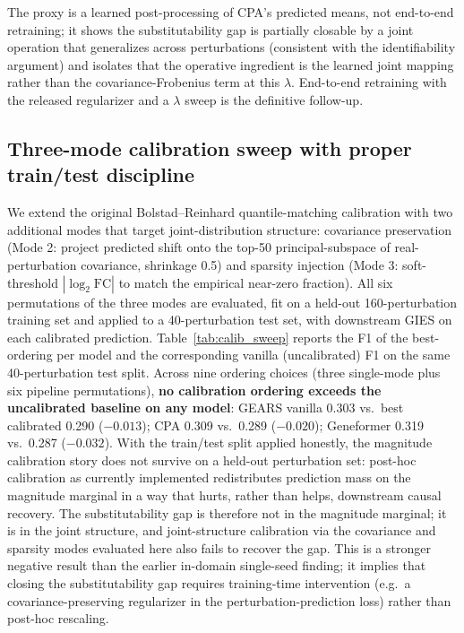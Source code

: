 \documentclass{article}
\theoremstyle{plain}
\theoremstyle{definition}
\theoremstyle{remark}
\begin{document}
The proxy is a learned post-processing of CPA's predicted means, not end-to-end retraining; it shows the substitutability gap is partially closable by a joint operation that generalizes across perturbations (consistent with the identifiability argument) and isolates that the operative ingredient is the learned joint mapping rather than the covariance-Frobenius term at this $\lambda$. End-to-end retraining with the released regularizer and a $\lambda$ sweep is the definitive follow-up.

\subsection{Three-mode calibration sweep with proper train/test discipline}
\label{app:calib-sweep}
We extend the original Bolstad--Reinhard quantile-matching calibration with two additional modes that target joint-distribution structure: covariance preservation (Mode 2: project predicted shift onto the top-50 principal-subspace of real-perturbation covariance, shrinkage 0.5) and sparsity injection (Mode 3: soft-threshold $|\log_2 \mathrm{FC}|$ to match the empirical near-zero fraction). All six permutations of the three modes are evaluated, fit on a held-out 160-perturbation training set and applied to a 40-perturbation test set, with downstream GIES on each calibrated prediction. Table~\ref{tab:calib_sweep} reports the F1 of the best-ordering per model and the corresponding vanilla (uncalibrated) F1 on the same 40-perturbation test split. Across nine ordering choices (three single-mode plus six pipeline permutations), \textbf{no calibration ordering exceeds the uncalibrated baseline on any model}: GEARS vanilla 0.303 vs.\ best calibrated 0.290 ($-0.013$); CPA 0.309 vs.\ 0.289 ($-0.020$); Geneformer 0.319 vs.\ 0.287 ($-0.032$). With the train/test split applied honestly, the magnitude calibration story does not survive on a held-out perturbation set: post-hoc calibration as currently implemented redistributes prediction mass on the magnitude marginal in a way that hurts, rather than helps, downstream causal recovery. The substitutability gap is therefore not in the magnitude marginal; it is in the joint structure, and joint-structure calibration via the covariance and sparsity modes evaluated here also fails to recover the gap. This is a stronger negative result than the earlier in-domain single-seed finding; it implies that closing the substitutability gap requires training-time intervention (e.g.\ a covariance-preserving regularizer in the perturbation-prediction loss) rather than post-hoc rescaling.
\end{document}
